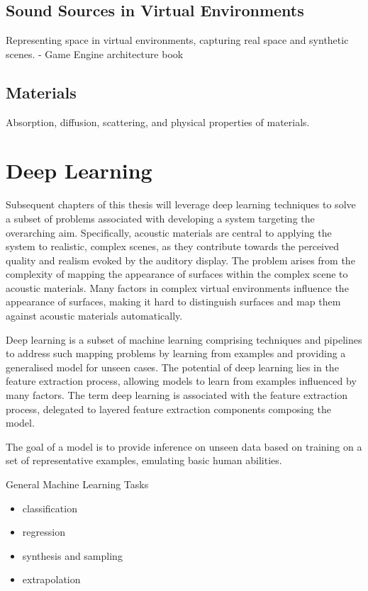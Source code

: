 \subsection{Sound Sources in Virtual Environments}


Representing space in virtual environments, capturing real space and synthetic scenes.
- Game Engine architecture book                             

\subsection{Materials}
Absorption, diffusion, scattering, and physical properties of materials.


\section{Deep Learning}
Subsequent chapters of this thesis will leverage deep learning techniques to solve a subset of problems associated with developing a system targeting the overarching aim. Specifically, acoustic materials are central to applying the system to realistic, complex scenes, as they contribute towards the perceived quality and realism evoked by the auditory display. The problem arises from the complexity of mapping the appearance of surfaces within the complex scene to acoustic materials. Many factors in complex virtual environments influence the appearance of surfaces, making it hard to distinguish surfaces and map them against acoustic materials automatically.\par
Deep learning is a subset of machine learning comprising techniques and pipelines to address such mapping problems by learning from examples and providing a generalised model for unseen cases. The potential of deep learning lies in the feature extraction process, allowing models to learn from examples influenced by many factors. The term deep learning is associated with the feature extraction process, delegated to layered feature extraction components composing the model.\par
The goal of a model is to provide inference on unseen data based on training on a set of representative examples, emulating basic human abilities.

General Machine Learning Tasks

\cite{goodfellow2016deep}
\begin{itemize}
    \item classification
    \item regression
    \item synthesis and sampling
    \item extrapolation
\end{itemize}


